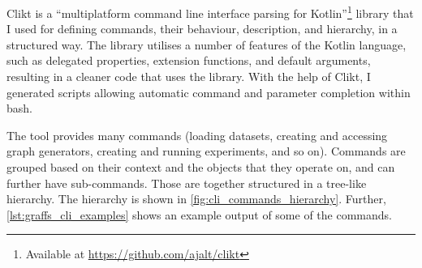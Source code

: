 Clikt is a \enquote{multiplatform command line interface parsing for Kotlin}\footnote{Available at \url{https://github.com/ajalt/clikt}} library that I used for defining commands, their behaviour, description, and hierarchy, in a structured way.
The library utilises a number of features of the Kotlin language, such as delegated properties, extension functions, and default arguments, resulting in a cleaner code that uses the library.
With the help of Clikt, I generated scripts allowing automatic command and parameter completion within bash.

The \graffs tool provides many commands (loading datasets, creating and accessing graph generators, creating and running experiments, and so on).
Commands are grouped based on their context and the objects that they operate on, and can further have sub-commands.
Those are together structured in a tree-like hierarchy.
The hierarchy is shown in \autoref{fig:cli_commands_hierarchy}.
Further, \autoref{lst:graffs_cli_examples} shows an example output of some of the commands.



